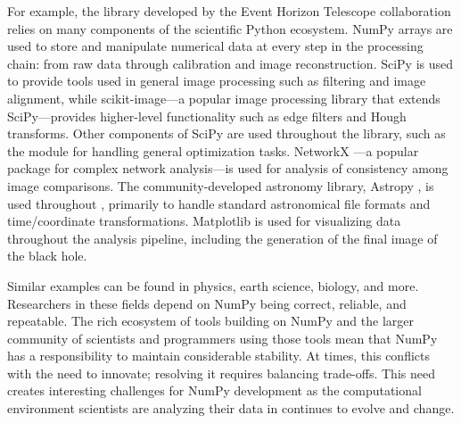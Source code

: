 For example, the  library developed by the Event Horizon Telescope 
collaboration relies on many components of the scientific Python ecosystem.
NumPy arrays are used to store and manipulate numerical data at every step
in the processing chain: from raw data through calibration and image 
reconstruction.
SciPy is used to provide tools used in general image processing such as 
filtering and image alignment, while scikit-image---a popular image processing
library that extends SciPy---provides higher-level functionality such as
edge filters and Hough transforms.
Other components of SciPy are used throughout the library, such as the
 module for handling general optimization tasks.
NetworkX \cite{SciPyProceedings_11}---a popular package for complex
network analysis---is used for analysis of consistency among image
comparisons.
The community-developed astronomy library, Astropy \cite{astropy:2013, astropy:2018},
is used throughout , primarily to handle standard
astronomical file formats and time/coordinate transformations.
Matplotlib is used for visualizing data throughout the analysis pipeline,
including the generation of the final image of the black hole.


Similar examples can be found in physics, earth science, biology,
and more.
Researchers in these fields depend on NumPy being correct, reliable,
and repeatable.
The rich ecosystem of tools building on NumPy and the larger community
of scientists and programmers using those tools mean that NumPy has a
responsibility to maintain considerable stability.
At times, this conflicts with the need to innovate;
resolving it requires balancing trade-offs.
This need creates interesting challenges for NumPy development as the
computational environment scientists are analyzing their data in continues
to evolve and change.

